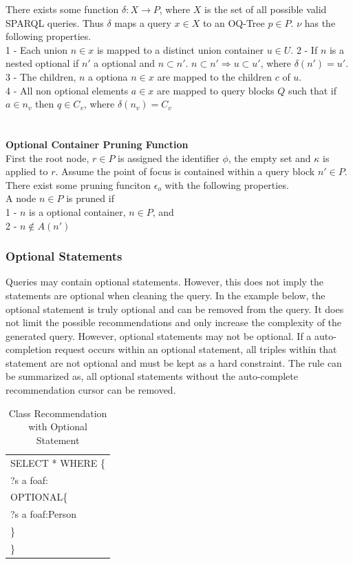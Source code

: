\documentclass[11pt,onecolumn]{article}
\newcommand{\tab}{\hspace*{2em}}
\begin{document}
There exists some function $\delta: X \rightarrow P $, where $X$ is the set of all possible valid SPARQL queries. Thus $\delta$ maps a query $x \in X$ to an OQ-Tree $p \in P$.  $\nu$ has the following properties.\\
1 - Each union $n \in x$ is mapped to a distinct union container $u \in U$.  
2 - If $n$ is a nested optional if $n'$ a optional and $n \subset n'$.  $n \subset n' \Rightarrow u \subset u'$, where $\delta(n') = u'$. 
3 - The children, $n$ a optiona $n \in x$ are mapped to the children $c$ of $u$.  \\
4 - All non optional elements $a \in x$ are mapped to query blocks $Q$ such that if $a \in n_v $ then $q \in C_v$, where $\delta(n_v) = C_v$\\
\\
\\
{\bf Optional Container Pruning Function}\\
First the root node, $r \in P$ is assigned the identifier $\phi$, the empty set and $\kappa$ is applied to $r$.  Assume the point of focus is contained within a query block $n' \in P$.  There exist some pruning funciton $\epsilon_o$ with the following properties.\\
A node $n \in P$  is pruned if  \\
1 - $n$ is a optional container, $n \in P$, and \\
2 - $n \notin A(n')$\\







\subsubsection{Optional Statements}
Queries may contain optional statements.  However, this does not imply the statements are optional when cleaning the query.   In the example below, the optional statement is truly optional and can be removed from the query.  It does not limit the possible recommendations and only increase the complexity of the generated query.  However, optional statements may not be optional.  If a auto-completion request occurs within an optional statement, all triples within that statement are not optional and must be kept as a hard constraint.  The rule can be summarized as, all optional statements without the auto-complete recommendation cursor can be removed.

\begin{table}[h!]
\begin{center}
  \begin{tabular}{| l | }
    \hline
    SELECT * WHERE \{\\  
    \tab ?s a foaf:\\ 
    \tab OPTIONAL\{ \\
    \tab \tab ?s a foaf:Person \\
    \tab \} \\
    \}    \\ \hline
  \end{tabular}
\end{center}
\caption{Class Recommendation with Optional Statement}
\end{table}
\end{document}

